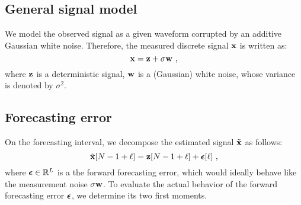 \subsection{General signal model}
We model the observed signal as a given waveform corrupted by an additive Gaussian white noise. Therefore, the measured discrete signal ${\mathbf x}$ is written as:
\[ 
{\mathbf x} = {\mathbf z} + \sigma{\mathbf w}\ ,
\]
where ${\mathbf z}$ is a deterministic signal, ${\mathbf w}$ is a (Gaussian) white noise, whose variance is denoted by $\sigma^2$. %

\subsection{Forecasting error}
On the forecasting interval, we decompose the estimated signal $\tilde{{\mathbf x}}$ as follows:
\[
\tilde {{\mathbf x}}[N-1+\ell] = {\mathbf z}[N-1+\ell] + \boldsymbol{\epsilon}[\ell]\ ,
\]
where $\boldsymbol{\epsilon}\in{\mathbb R}^L$ is a the forward forecasting error, which would ideally behave like the measurement noise $\sigma{\mathbf w}$.  To evaluate the actual behavior of the forward forecasting error $\boldsymbol{\epsilon}$, we determine its two first moments.
